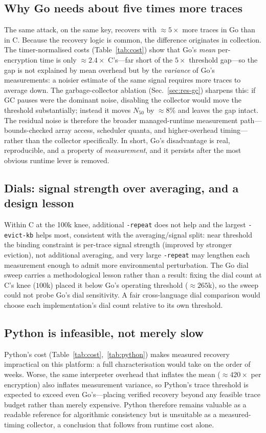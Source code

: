 \documentclass[11pt]{article}
\begin{document}
\subsection{Why Go needs about five times more traces}
\label{sec:an-crosslang}
The same attack, on the same key, recovers with $\approx5\times$ more traces in
Go than in C. Because the recovery logic is common, the difference originates in
collection. The timer-normalised costs (Table~\ref{tab:cost}) show that Go's
\emph{mean} per-encryption time is only $\approx2.4\times$ C's---far short of the
$5\times$ threshold gap---so the gap is not explained by mean overhead but by the
\emph{variance} of Go's measurements: a noisier estimate of the same signal
requires more traces to average down. The garbage-collector ablation
(Sec.~\ref{sec:res-gc}) sharpens this: if GC pauses were the dominant noise,
disabling the collector would move the threshold substantially; instead it moves
$N_{50}$ by $\approx8\%$ and leaves the gap intact. The residual noise is
therefore the broader managed-runtime measurement path---bounds-checked array
access, scheduler quanta, and higher-overhead timing---rather than the collector
specifically. In short, Go's disadvantage is real, reproducible, and a property
of \emph{measurement}, and it persists after the most obvious runtime lever is
removed.

\subsection{Dials: signal strength over averaging, and a design lesson}
\label{sec:an-dial}
Within C at the 100k knee, additional \texttt{-repeat} does not help and the
largest \texttt{-evict-kb} helps most, consistent with the averaging/signal
split: near threshold the binding constraint is per-trace signal strength
(improved by stronger eviction), not additional averaging, and very large
\texttt{-repeat} may lengthen each measurement enough to admit more
environmental perturbation. The Go dial sweep carries a methodological lesson
rather than a result: fixing the dial count at C's knee ($100$k) placed it below
Go's operating threshold ($\approx265$k), so the sweep could not probe Go's dial
sensitivity. A fair cross-language dial comparison would choose each
implementation's dial count relative to its own threshold.

\subsection{Python is infeasible, not merely slow}
\label{sec:an-python}
Python's cost (Table~\ref{tab:cost},~\ref{tab:python}) makes measured recovery
impractical on this platform: a full characterisation would take on the order of
weeks. Worse, the same interpreter overhead that inflates the mean
($\approx420\times$ per encryption) also inflates measurement variance, so
Python's trace threshold is expected to exceed even Go's---placing verified
recovery beyond any feasible trace budget rather than merely expensive. Python
therefore remains valuable as a readable reference for algorithmic consistency
but is unsuitable as a measured-timing collector, a conclusion that follows from
runtime cost alone.
\end{document}
